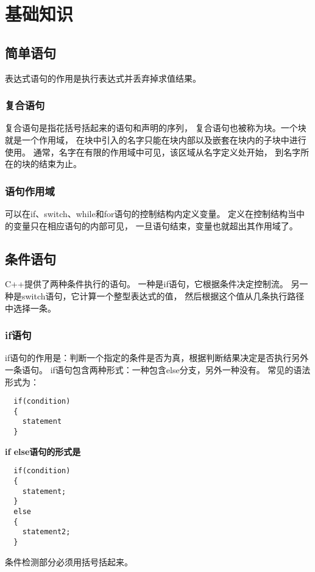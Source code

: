 \chapter{基础知识}
\section{简单语句}
表达式语句的作用是执行表达式并丢弃掉求值结果。%
\subsection{复合语句}
复合语句是指花括号括起来的语句和声明的序列，%
复合语句也被称为块。一个块就是一个作用域，%
在块中引入的名字只能在块内部以及嵌套在块内的子块中进行使用。%
通常，名字在有限的作用域中可见，该区域从名字定义处开始，%
到名字所在的块的结束为止。%
\subsection{语句作用域}
可以在if、switch、while和for语句的控制结构内定义变量。%
定义在控制结构当中的变量只在相应语句的内部可见，%
一旦语句结束，变量也就超出其作用域了。%
\section{条件语句}
C++提供了两种条件执行的语句。%
一种是if语句，它根据条件决定控制流。%
另一种是switch语句，它计算一个整型表达式的值，%
然后根据这个值从几条执行路径中选择一条。
\subsection{if语句}
if语句的作用是：判断一个指定的条件是否为真，根据判断结果决定是否执行另外一条语句。%
if语句包含两种形式：一种包含else分支，另外一种没有。%
常见的语法形式为：
\begin{lstlisting}
  if(condition)
  {
    statement
  }
\end{lstlisting}
{\bfseries{if else语句的形式是}}
\begin{lstlisting}
  if(condition)
  {
    statement;
  }
  else
  {
    statement2;
  }
\end{lstlisting}
条件检测部分必须用括号括起来。
